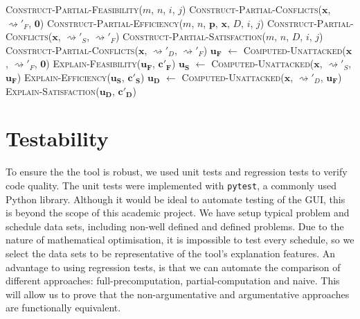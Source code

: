 \begin{algorithm}[H]
	\caption{}
	\begin{algorithmic}[1]
				\State \Return \textsc{Construct-Partial-Feasibility}($m$, $n$, $i$, $j$)
			\EndFunction
				\State \Return \textsc{Construct-Partial-Conflicts}($\mathbf{x}$, $\rightsquigarrow'_F$, $\mathbf{0}$)
			\EndFunction
				\State \Return \textsc{Construct-Partial-Efficiency}($m$, $n$, $\mathbf{p}$, $\mathbf{x}$, $D$, $i$, $j$)
			\EndFunction
				\State \Return \textsc{Construct-Partial-Conflicts}($\mathbf{x}$, $\rightsquigarrow'_S$, $\rightsquigarrow'_F$)
			\EndFunction
				\State \Return \textsc{Construct-Partial-Satisfaction}($m$, $n$, $D$, $i$, $j$)
			\EndFunction
				\State \Return \textsc{Construct-Partial-Conflicts}($\mathbf{x}$, $\rightsquigarrow'_D$, $\rightsquigarrow'_F$)
			\EndFunction
			\State $\mathbf{u_F}$ $\gets$ \textsc{Computed-Unattacked}($\mathbf{x}$, $\rightsquigarrow'_F$, $\mathbf{0}$)
			\State \textsc{Explain-Feasibility}($\mathbf{u_F}$, $\mathbf{c'_F}$)
			\State $\mathbf{u_S}$ $\gets$ \textsc{Computed-Unattacked}($\mathbf{x}$, $\rightsquigarrow'_S$, $\mathbf{u_F}$)
			\State \textsc{Explain-Efficiency}($\mathbf{u_S}$, $\mathbf{c'_S}$)
			\State $\mathbf{u_D}$ $\gets$ \textsc{Computed-Unattacked}($\mathbf{x}$, $\rightsquigarrow'_D$, $\mathbf{u_F}$)
			\State \textsc{Explain-Satisfaction}($\mathbf{u_D}$, $\mathbf{c'_D}$)
		\EndFunction
	\end{algorithmic}
\end{algorithm}

\section{Testability}

To ensure the the tool is robust, we used unit tests and regression tests to verify code quality. The unit tests were implemented with \texttt{pytest}, a commonly used Python library. Although it would be ideal to automate testing of the GUI, this is beyond the scope of this academic project. We have setup typical problem and schedule data sets, including non-well defined and defined problems. Due to the nature of mathematical optimisation, it is impossible to test every schedule, so we select the data sets to be representative of the tool's explanation features. An advantage to using regression tests, is that we can automate the comparison of different approaches: full-precomputation, partial-computation and naive. This will allow us to prove that the non-argumentative and argumentative approaches are functionally equivalent.